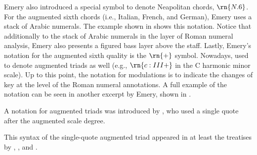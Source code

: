 

Emery also introduced a special symbol to denote Neapolitan
chords, $\rn{N.6}$. For the augmented sixth chords (i.e.,
Italian, French, and German), Emery uses a stack of Arabic
numerals. The example shown in
 shows this
notation. Notice that additionally to the stack of Arabic
numerals in the layer of Roman numeral analysis, Emery also
presents a figured bass layer above the staff. Lastly,
Emery's notation for the augmented sixth quality is the
$\rn{+}$ symbol. Nowadays, used to denote augmented triads
as well (e.g., $\rn{c:III+}$ in the C harmonic minor scale).
Up to this point, the notation for modulations is to
indicate the changes of key at the level of the Roman
numeral annotations. A full example of the notation can be
seen in another excerpt by Emery, shown in
.


A notation for augmented triads was introduced by
\textcite{jadassohn1883lehrbuch}, who used a single quote
after the augmented scale degree.


This syntax of the single-quote augmented triad appeared in
at least the treatises by \textcite{broekhoven1889system},
\textcite{buwa1893schule}, and
\textcite{shepard1896harmony}.

